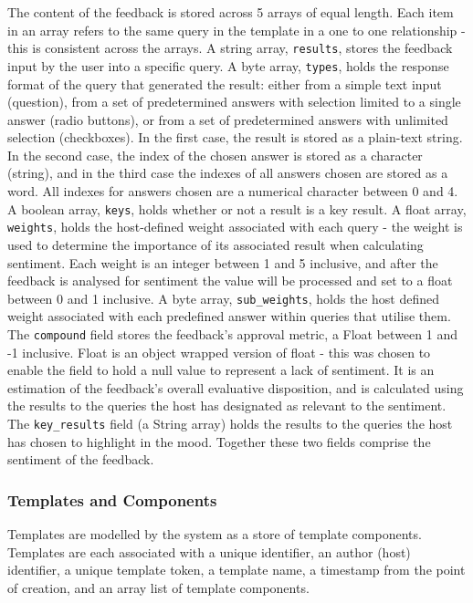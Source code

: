 \documentclass[9pt, titlepage]{extarticle}
\begin{document}
The content of the feedback is stored across 5 arrays of equal length. Each item in an array refers to the same query in the template in a one to one relationship - this is consistent across the arrays. A string array, \texttt{results}, stores the feedback input by the user into a specific query. A byte array, \texttt{types}, holds the response format of the query that generated the result: either from a simple text input (question), from a set of predetermined answers with selection limited to a single answer (radio buttons), or from a set of predetermined answers with unlimited selection (checkboxes). In the first case, the result is stored as a plain-text string. In the second case, the index of the chosen answer is stored as a character (string), and in the third case the indexes of all answers chosen are stored as a word. All indexes for answers chosen are a numerical character between 0 and 4. A boolean array, \texttt{keys}, holds whether or not a result is a key result. A float array, \texttt{weights}, holds the host-defined weight associated with each query - the weight is used to determine the importance of its associated result when calculating sentiment. Each weight is an integer between 1 and 5 inclusive, and after the feedback is analysed for sentiment the value will be processed and set to a float between 0 and 1 inclusive. A byte array, \texttt{sub\_weights}, holds the host defined weight associated with each predefined answer within queries that utilise them.\\

The \texttt{compound} field stores the feedback's approval metric, a Float between 1 and -1 inclusive. Float is an object wrapped version of float - this was chosen to enable the field to hold a null value to represent a lack of sentiment. It is an estimation of the feedback's overall evaluative disposition, and is calculated using the results to the queries the host has designated as relevant to the sentiment. The \texttt{key\_results} field (a String array) holds the results to the queries the host has chosen to highlight in the mood. Together these two fields comprise the sentiment of the feedback.

\subsubsection{Templates and Components} \label{sec:templates}

Templates are modelled by the system as a store of template components. Templates are each associated with a unique identifier, an author (host) identifier, a unique template token, a template name, a timestamp from the point of creation, and an array list of template components.\\
\end{document}
